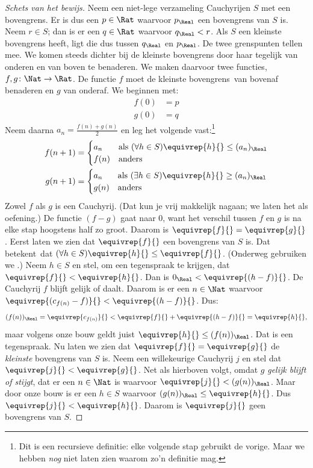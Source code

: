 \documentclass[../../../include/open-logic-section]{subfiles}
\begin{document}
\begin{proof}[Schets van het bewijs] Neem een niet-lege verzameling
Cauchyrijen $S$ met een bovengrens. Er is dus een $p \in \Rat$ waarvoor
$p_{\Real}$ een bovengrens van $S$ is. Neem $r \in S$; dan is er een
$q \in \Rat$ waarvoor $q_{\Real} < r$. Als $S$ een kleinste bovengrens
heeft, ligt die dus tussen $q_\Real$ en $p_\Real$. De twee grenspunten
tellen mee.
We komen steeds dichter bij de kleinste bovengrens door haar tegelijk
van onderen en van boven te benaderen. We maken daarvoor twee functies,
$f, g \colon \Nat \to \Rat$. De functie $f$ moet de kleinste
bovengrens\ van bovenaf benaderen en $g$ van onderaf. We beginnen met:
\begin{align*}
	f(0) &= p \\
	g(0) &= q
\end{align*}
Neem daarna $a_n = \frac{f(n) + g(n)}{2}$ en leg het volgende
vast:\footnote{Dit is een recursieve definitie: elke volgende stap
gebruikt de vorige. Maar we hebben \emph{nog} niet laten zien waarom
zo'n definitie mag.}
\begin{align*}
	f(n+1) &=
	\begin{cases}
		a_n &\text{als }(\forall h \in S)\equivrep{h}{} \leq (a_n)_\Real\\
		f(n)&\text{anders}
	\end{cases}\\
	g(n+1) &=
	\begin{cases}
		a_n &\text{als }(\exists h \in S)\equivrep{h}{} \geq (a_n)_\Real\\
	 	g(n) &\text{anders}
	\end{cases}
\end{align*}
Zowel $f$ als $g$ is een Cauchyrij. (Dat kun je vrij makkelijk
nagaan; we laten het als oefening.) De functie $(f-g)$ gaat naar $0$,
want het verschil tussen $f$ en $g$ is na elke stap hoogstens half zo groot.
Daarom is $\equivrep{f}{} = \equivrep{g}{}$.
Eerst laten we zien dat $\equivrep{f}{}$ een bovengrens van $S$ is.
Dat betekent\ dat $(\forall h \in S)\equivrep{h}{} \leq
\equivrep{f}{}$. (Onderweg gebruiken we
.) Neem $h \in S$ en stel, om een
tegenspraak te krijgen, dat $\equivrep{f}{} < \equivrep{h}{}$. Dan is
$0_\Real < \equivrep{(h-f)}{}$. De Cauchyrij $f$ blijft gelijk of
daalt. Daarom is er een $n \in \Nat$ waarvoor
$\equivrep{(c_{f(n)} - f)}{} < \equivrep{(h-f)}{}$. Dus:
\[
	(f(n))_\Real = \equivrep{c_{f(n)}}{} < \equivrep{f}{} + \equivrep{(h-f)}{} = \equivrep{h}{},
\]
maar volgens onze bouw geldt juist $\equivrep{h}{} \leq
(f(n))_\Real$. Dat is een tegenspraak.
Nu laten we zien dat $\equivrep{f}{} = \equivrep{g}{}$ de
\emph{kleinste} bovengrens van $S$ is. Neem een willekeurige Cauchyrij
$j$ en stel dat $\equivrep{j}{} < \equivrep{g}{}$. Net als hierboven
volgt, omdat $g$ \emph{gelijk blijft of stijgt}, dat er een $n \in \Nat$ is
waarvoor $\equivrep{j}{} < (g(n))_\Real$. Maar door onze bouw is er een
$h \in S$ waarvoor $(g(n))_\Real \leq \equivrep{h}{}$. Dus
$\equivrep{j}{} < \equivrep{h}{}$. Daarom is $\equivrep{j}{}$ geen
bovengrens van $S$.
\end{proof}
\end{document}
